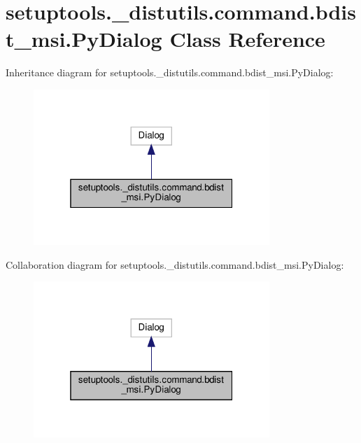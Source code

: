 \hypertarget{classsetuptools_1_1__distutils_1_1command_1_1bdist__msi_1_1PyDialog}{}\section{setuptools.\+\_\+distutils.\+command.\+bdist\+\_\+msi.\+Py\+Dialog Class Reference}
\label{classsetuptools_1_1__distutils_1_1command_1_1bdist__msi_1_1PyDialog}


Inheritance diagram for setuptools.\+\_\+distutils.\+command.\+bdist\+\_\+msi.\+Py\+Dialog\+:
\nopagebreak
\begin{figure}[H]
\begin{center}
\leavevmode
\includegraphics[width=253pt]{classsetuptools_1_1__distutils_1_1command_1_1bdist__msi_1_1PyDialog__inherit__graph}
\end{center}
\end{figure}


Collaboration diagram for setuptools.\+\_\+distutils.\+command.\+bdist\+\_\+msi.\+Py\+Dialog\+:
\nopagebreak
\begin{figure}[H]
\begin{center}
\leavevmode
\includegraphics[width=253pt]{classsetuptools_1_1__distutils_1_1command_1_1bdist__msi_1_1PyDialog__coll__graph}
\end{center}
\end{figure}
